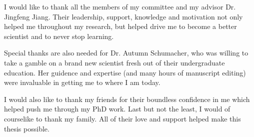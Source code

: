 %

I would like to thank all the members of my committee and my advisor Dr. Jingfeng Jiang. Their leadership, support, knowledge and motivation not only helped me throughout my research, but helped drive me to become a better scientist and to never stop learning.

Special thanks are also needed for Dr. Autumn Schumacher, who was willing to take a gamble on a brand new scientist fresh out of their undergraduate education. Her guidence and expertise (and many hours of manuscript editing) were invaluable in getting me to where I am today.

I would also like to thank my friends for their boundless confidence in me which helped push me through my PhD work. Last but not the least, I would of courselike to thank my family. All of their love and support helped make this thesis possible.